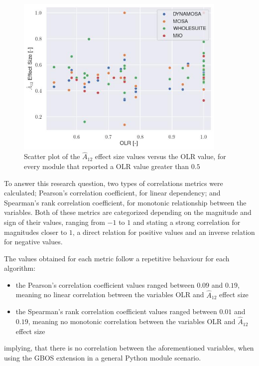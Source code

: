 \documentclass[%
  chapterprefix=false,%
  open=right,%
  twoside=true,%
  paper=a4,%
  logofile={Figures/logo.png},%
  thesistype=master,%
  UKenglish,%
]{se2thesis}
\begin{document}
\begin{figure}[bth]
  \centering
  \includegraphics[width=0.9\textwidth]{Figures/Results/scatterplot.jpg}
  \caption{Scatter plot of the \(\hat{A}_{12}\) effect size values versus the OLR value, for every module that reported a OLR value greater than \(0.5\)}\label{fig:scatter}
\end{figure}

To answer this research question, two types of correlations metrics were calculated; Pearson's correlation coefficient, for linear dependency; and Spearman's rank correlation coefficient, for monotonic relationship between the variables.
Both of these metrics are categorized depending on the magnitude and sign of their values, ranging from \(-1\) to \(1\) and stating a strong correlation for magnitudes closer to \(1\), a direct relation for positive values and an inverse relation for negative values.

The values obtained for each metric follow a repetitive behaviour for each algorithm:
\begin{itemize}
  \item the Pearson's correlation coefficient values ranged between \(0.09\) and \(0.19\), meaning no linear correlation between the variables OLR and \(\hat{A}_{12}\) effect size
  \item the Spearman's rank correlation coefficient values ranged between \(0.01\) and \(0.19\), meaning no monotonic correlation between the variables OLR and \(\hat{A}_{12}\) effect size
\end{itemize}

implying, that there is no correlation between the aforementioned variables, when using the GBOS extension in a general Python module scenario.
\end{document}
